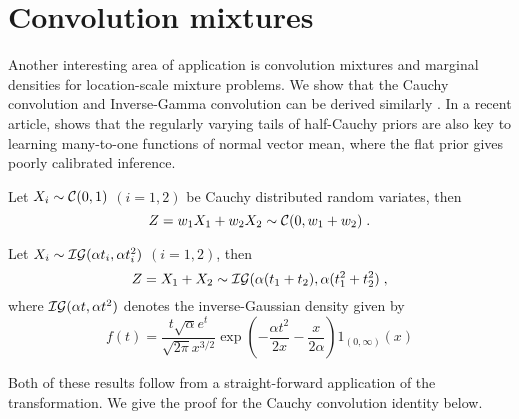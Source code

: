 \documentclass[lineno]{biometrika}
\begin{document}
\section{Convolution mixtures}
\label{sec:convolutions}

Another interesting area of application is convolution mixtures and marginal
densities for location-scale mixture problems. We show that the Cauchy
convolution \citep{pillai2015unexpected} and Inverse-Gamma convolution can be
derived similarly \citep{gelman_prior_2006, polson_halfcauchy_2012}.  In a recent 
article, \citet{bhadra_default_2016} shows that the regularly varying tails of
half-Cauchy priors are also key to learning many-to-one functions of normal
vector mean, where the flat prior gives poorly calibrated inference. 
\begin{lemma}
  Let $X_i \sim \mathcal{C}(0,1)$ $(i = 1, 2)$ be Cauchy distributed random
  variates, then 
  $$
  Z = w_1 X_1 + w_2 X_2 \sim \mathcal{C}( 0, w_1 + w_2)
  \;.
  $$
\end{lemma}
\begin{lemma}
  Let $X_i \sim \mathcal{IG}(\alpha t_i, \alpha t_i^2)$ $(i = 1, 2)$, then 
  $$
    Z = X_1 + X_2 \sim \mathcal{IG}(\alpha (t_1 + t_2), \alpha (t_1^2+t_2^2)
    \;,
  $$ 
  where $\mathcal{IG}(\alpha t, \alpha t^2)$ denotes the inverse-Gaussian 
  density given by
  $$
    f(t) = \frac{t \sqrt{\alpha} e^t}{\sqrt{2 \pi} x^{3/2}} 
    \exp\left( -\frac{\alpha t^2}{2x} - \frac{x}{2\alpha} \right) 1_{(0,\infty)}(x) 
  $$
\end{lemma}

Both of these results follow from a straight-forward application of the \CS{} 
transformation. We give the proof for the Cauchy convolution identity below.
\end{document}
